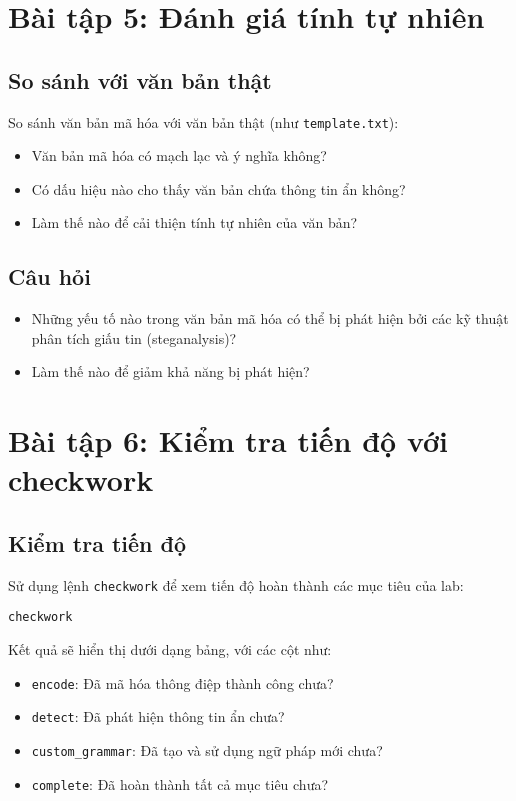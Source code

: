 \documentclass{article}
\begin{document}
\section{Bài tập 5: Đánh giá tính tự nhiên}
\subsection{So sánh với văn bản thật}
So sánh văn bản mã hóa với văn bản thật (như \texttt{template.txt}):

\begin{itemize}
    \item Văn bản mã hóa có mạch lạc và ý nghĩa không?
    \item Có dấu hiệu nào cho thấy văn bản chứa thông tin ẩn không?
    \item Làm thế nào để cải thiện tính tự nhiên của văn bản?
\end{itemize}

\subsection{Câu hỏi}
\begin{itemize}
    \item Những yếu tố nào trong văn bản mã hóa có thể bị phát hiện bởi các kỹ thuật phân tích giấu tin (steganalysis)?
    \item Làm thế nào để giảm khả năng bị phát hiện?
\end{itemize}

\section{Bài tập 6: Kiểm tra tiến độ với checkwork}
\subsection{Kiểm tra tiến độ}
Sử dụng lệnh \texttt{checkwork} để xem tiến độ hoàn thành các mục tiêu của lab:

\begin{lstlisting}
checkwork
\end{lstlisting}

Kết quả sẽ hiển thị dưới dạng bảng, với các cột như:

\begin{itemize}
    \item \texttt{encode}: Đã mã hóa thông điệp thành công chưa?
    \item \texttt{detect}: Đã phát hiện thông tin ẩn chưa?
    \item \texttt{custom_grammar}: Đã tạo và sử dụng ngữ pháp mới chưa?
    \item \texttt{complete}: Đã hoàn thành tất cả mục tiêu chưa?
\end{itemize}
\end{document}
